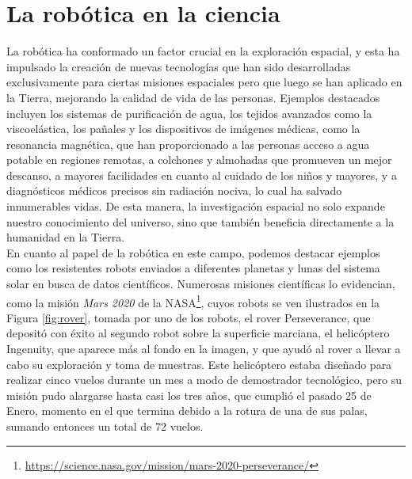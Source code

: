 \section{La robótica en la ciencia}
\label{sec:exploracion_espacial} %

La robótica ha conformado un factor crucial en la exploración espacial, y esta
ha impulsado la creación de nuevas tecnologías que han sido desarrolladas
exclusivamente para ciertas misiones espaciales pero que luego se han aplicado
en la Tierra, mejorando la calidad de vida de las personas.
Ejemplos destacados incluyen los sistemas de purificación de agua, los tejidos
avanzados como la viscoelástica, los pañales y los dispositivos de imágenes
médicas, como la resonancia magnética, que han proporcionado a las personas
acceso a agua potable en regiones remotas, a colchones y almohadas que promueven
un mejor descanso, a mayores facilidades en cuanto al cuidado de los niños y
mayores, y a diagnósticos médicos precisos sin radiación nociva, lo cual ha
salvado innumerables vidas.
De esta manera, la investigación espacial no solo expande nuestro conocimiento
del universo, sino que también beneficia directamente a la humanidad en la
Tierra.
\\

En cuanto al papel de la robótica en este campo, podemos destacar ejemplos como
los resistentes robots enviados a diferentes planetas y lunas del sistema solar
en busca de datos científicos.
Numerosas misiones científicas lo evidencian, como la misión \textit{Mars 2020}
de la
NASA\footnote{\url{https://science.nasa.gov/mission/mars-2020-perseverance/}},
cuyos robots se ven ilustrados en la Figura \ref{fig:rover}, tomada por uno de
los robots, el rover Perseverance, que depositó con éxito al segundo robot sobre
la superficie marciana, el helicóptero Ingenuity, que aparece más al fondo en la
imagen, y que ayudó al rover a llevar a cabo su exploración y toma de muestras.
Este helicóptero estaba diseñado para realizar cinco vuelos durante un mes a
modo de demostrador tecnológico, pero su misión pudo alargarse hasta casi los
tres años, que cumplió el pasado 25 de Enero, momento en el que termina debido a
la rotura de una de sus palas, sumando entonces un total de 72 vuelos.

